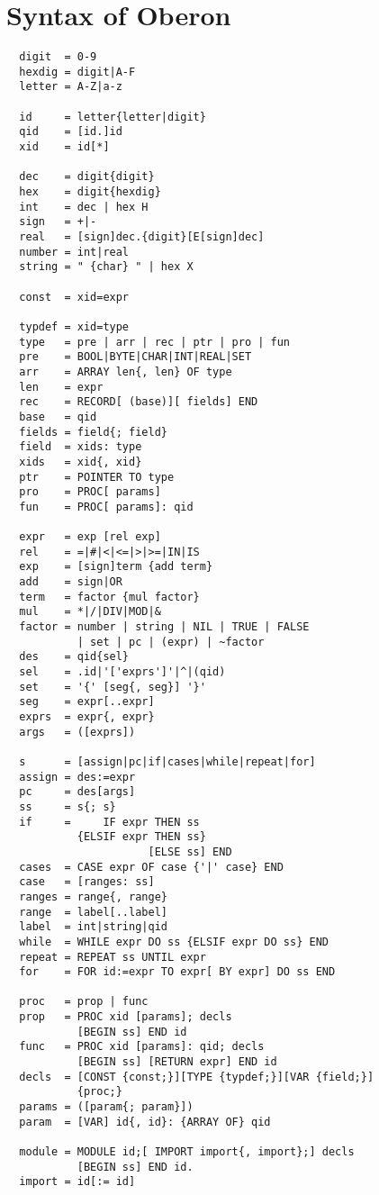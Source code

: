 \chapter{Syntax of Oberon}
\begin{verbatim}
  digit  = 0-9
  hexdig = digit|A-F
  letter = A-Z|a-z
 
  id     = letter{letter|digit}
  qid    = [id.]id
  xid    = id[*]
 
  dec    = digit{digit}
  hex    = digit{hexdig}
  int    = dec | hex H
  sign   = +|-
  real   = [sign]dec.{digit}[E[sign]dec]
  number = int|real
  string = " {char} " | hex X
 
  const  = xid=expr
 
  typdef = xid=type
  type   = pre | arr | rec | ptr | pro | fun
  pre    = BOOL|BYTE|CHAR|INT|REAL|SET
  arr    = ARRAY len{, len} OF type
  len    = expr
  rec    = RECORD[ (base)][ fields] END
  base   = qid
  fields = field{; field}
  field  = xids: type
  xids   = xid{, xid}
  ptr    = POINTER TO type
  pro    = PROC[ params]
  fun    = PROC[ params]: qid
 
  expr   = exp [rel exp]
  rel    = =|#|<|<=|>|>=|IN|IS
  exp    = [sign]term {add term}
  add    = sign|OR
  term   = factor {mul factor}
  mul    = *|/|DIV|MOD|&
  factor = number | string | NIL | TRUE | FALSE
           | set | pc | (expr) | ~factor
  des    = qid{sel}
  sel    = .id|'['exprs']'|^|(qid)
  set    = '{' [seg{, seg}] '}'
  seg    = expr[..expr]
  exprs  = expr{, expr}
  args   = ([exprs])
 
  s      = [assign|pc|if|cases|while|repeat|for]
  assign = des:=expr
  pc     = des[args]
  ss     = s{; s}
  if     =     IF expr THEN ss
           {ELSIF expr THEN ss}
                      [ELSE ss] END
  cases  = CASE expr OF case {'|' case} END
  case   = [ranges: ss]
  ranges = range{, range}
  range  = label[..label]
  label  = int|string|qid
  while  = WHILE expr DO ss {ELSIF expr DO ss} END
  repeat = REPEAT ss UNTIL expr
  for    = FOR id:=expr TO expr[ BY expr] DO ss END
 
  proc   = prop | func
  prop   = PROC xid [params]; decls
           [BEGIN ss] END id
  func   = PROC xid [params]: qid; decls
           [BEGIN ss] [RETURN expr] END id
  decls  = [CONST {const;}][TYPE {typdef;}][VAR {field;}]
           {proc;}
  params = ([param{; param}])
  param  = [VAR] id{, id}: {ARRAY OF} qid
 
  module = MODULE id;[ IMPORT import{, import};] decls
           [BEGIN ss] END id.
  import = id[:= id]
\end{verbatim}
